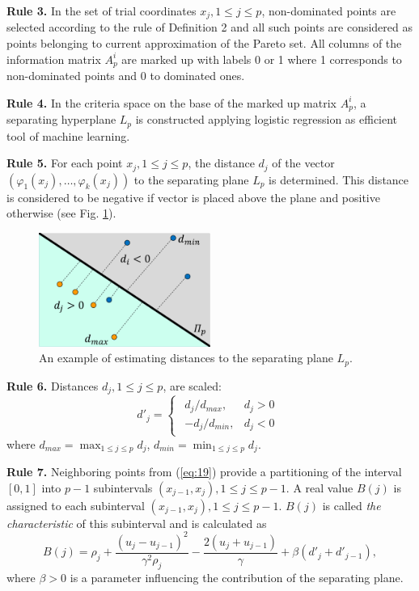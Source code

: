 \documentclass[runningheads]{llncs}
\begin{document}
\textbf{Rule 3.} In the set of trial coordinates $x_j, 1 \leq j \leq p$, non-dominated points are selected according to the rule of Definition 2 and all such points are considered as points belonging to current approximation of the Pareto set. All columns of the information matrix $A^i_p$ are marked up with labels 0 or 1 where 1 corresponds to non-dominated points and 0 to dominated ones.

\textbf{Rule 4.} In the criteria space on the base of the marked up matrix $A^i_p$, a separating hyperplane $L_p$ is constructed applying logistic regression \cite{Yu2011} as efficient tool of machine learning.

\textbf{Rule 5.} For each point $x_j, 1 \leq j \leq p$, the distance $d_j$ of the vector $(\varphi_1(x_j), \dots, \varphi_k(x_j))$ to the separating plane $L_p$ is determined. This distance is considered to be negative if vector is placed above the plane and positive otherwise (see Fig. \ref{fig:1}).

\begin{figure}
\centering
\includegraphics[width=0.5\textwidth]{fig1}
\caption{An example of estimating distances to the separating plane $L_p$.} \label{fig:1}
\end{figure}

\textbf{Rule 6.} Distances $d_j, 1 \leq j \leq p$, are scaled:     
\begin{equation}
    \label{eq:23}
d'_j=
\begin{cases}
  \begin{matrix}
     d_j / d_{max}, & d_j > 0 \\
     -d_j / d_{min}, & d_j < 0 
  \end{matrix}
\end{cases}
\end{equation}
where $d_{max} = \max_{1 \leq j \leq p} {d_j}$, $d_{min} = \min_{1 \leq j \leq p} {d_j}$.    

\textbf{Rule 7.} Neighboring points from (\ref{eq:19}) provide a partitioning of the interval $[0, 1]$ into $p-1$ subintervals $(x_{j-1}, x_j), 1 \leq j \leq p-1$.
A real value $B(j)$ is assigned to each subinterval $(x_{j-1}, x_j), 1 \leq j \leq p-1$. $B(j)$ is called \textit{the characteristic}  of this subinterval and is calculated as
\begin{equation}
    \label{eq:24}
    B(j) = \rho_j + \frac{(u_j-u_{j-1})^2}{\gamma^2 \rho_j} - \frac{2 (u_j+u_{j-1})}{\gamma} + \beta (d'_j + d'_{j-1}),
\end{equation}
where $\beta > 0$ is a parameter influencing the contribution of the separating plane. 
\end{document}

